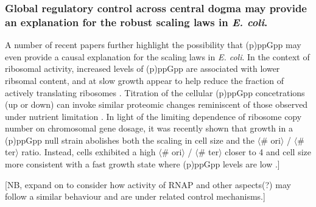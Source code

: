 \subsubsection{Global regulatory control across central dogma may
provide an explanation for the robust scaling laws in \textit{E. coli}.}

A number of recent papers further highlight the possibility that (p)ppGpp may
even provide a causal explanation for the scaling laws in \textit{E. coli}. In
the context of ribosomal activity, increased levels of (p)ppGpp are associated
with lower ribsomal content, and at slow growth appear to help reduce the
fraction of actively translating ribosomes \citep{dai2016, dai2018}. Titration
of the cellular (p)ppGpp concetrations (up or down) can invoke similar proteomic
changes reminiscent of those observed under nutrient limitation \citep{zhu2019}.
In light of the limiting dependence of ribosome copy number on chromosomal gene
dosage, it was recently shown that growth in a (p)ppGpp  null strain abolishes
both the scaling in cell size  and the $\langle$\# ori$\rangle$ / $\langle$\#
ter$\rangle$ ratio. Instead, cells exhibited a high $\langle$\# ori$\rangle$ /
$\langle$\# ter$\rangle$ closer to 4 and cell size more consistent with a fast
growth state where (p)ppGpp levels are low \citep{fernandezcoll2020}.]

[NB, expand on to consider how activity of RNAP and other aspects(?) may follow a
similar behaviour and are under related control mechanisms.]

